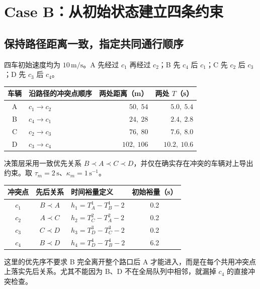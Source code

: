 \documentclass[UTF8,fontset=fandol,11pt,a4paper]{ctexart}
\newcommand{\unit}[1]{\,\mathrm{#1}}
\begin{document}
\newpage
\section{Case B：从初始状态建立四条约束}
\subsection{保持路径距离一致，指定共同通行顺序}
四车初始速度均为 $10\unit{m/s}$。A 先经过 $c_1$ 再经过 $c_2$；B 先 $c_4$ 后 $c_1$；C 先 $c_2$ 后 $c_3$；D 先 $c_3$ 后 $c_4$。
\begin{center}\small
\begin{tabular}{clrr}
\toprule
车辆 & 沿路径的冲突点顺序 & 两处距离（m） & 两处 $T$（s）\\\midrule
A & $c_1\to c_2$ & $50,\ 54$ & $5.0,\ 5.4$\\
B & $c_4\to c_1$ & $24,\ 28$ & $2.4,\ 2.8$\\
C & $c_2\to c_3$ & $76,\ 80$ & $7.6,\ 8.0$\\
D & $c_3\to c_4$ & $102,\ 106$ & $10.2,\ 10.6$\\\bottomrule
\end{tabular}\end{center}
决策层采用一致优先关系 $B\prec A\prec C\prec D$，并仅在确实存在冲突的车辆对上导出约束。取 $\tau_m=2\unit{s}$、$\kappa_m=1\unit{s^{-1}}$。
\begin{center}\small
\begin{tabular}{cclc}
\toprule
冲突点 & 先后关系 & 时间裕量定义 & 初始裕量（s）\\\midrule
$c_1$ & $B\prec A$ & $h_1=T_A^1-T_B^1-2$ & 0.2\\
$c_2$ & $A\prec C$ & $h_2=T_C^2-T_A^2-2$ & 0.2\\
$c_3$ & $C\prec D$ & $h_3=T_D^3-T_C^3-2$ & 0.2\\
$c_4$ & $B\prec D$ & $h_4=T_D^4-T_B^4-2$ & 6.2\\\bottomrule
\end{tabular}\end{center}
这里的优先序不要求 B 完全离开整个路口后 A 才能进入，而是在每个共用冲突点上落实先后关系。尤其不能因为 B、D 不在全局队列中相邻，就漏掉 $c_4$ 的直接冲突检查。
\end{document}
